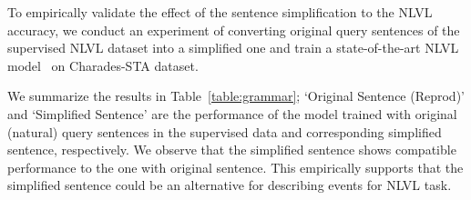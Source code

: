 To empirically validate the effect of the sentence simplification to the NLVL accuracy, we conduct an experiment of converting original query sentences of the supervised NLVL dataset into a simplified one and train a state-of-the-art NLVL model~\cite{mun2020LGI} on Charades-STA dataset.

We summarize the results in Table~\ref{table:grammar}; `Original Sentence (Reprod)' and `Simplified Sentence' are the performance of the model trained with original (natural) query sentences in the supervised data and corresponding simplified sentence, respectively.
%
We observe that the simplified sentence shows compatible performance to the one with original sentence. 
This empirically supports that the simplified sentence could be an alternative for describing events for NLVL task.


\begin{table}[t]
    \centering
    \caption{\textbf{NLVL accuracy by different description formats on Charades-STA using LGI model}~\cite{mun2020LGI}. `Reprod.' indicates our reproduction of~\cite{mun2020LGI} by authors' implementation\protect\footnote{{\url{https://github.com/JonghwanMun/LGI4temporalgrounding}}}.}
    \vspace{-1em}
    \label{table:grammar}
\end{table}

